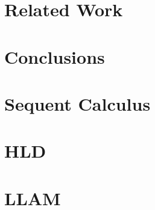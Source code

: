 \documentclass{llncs}
\begin{document}
\section{Related Work}


\section{Conclusions}





\clearpage
\appendix
\section{Sequent Calculus}

\section{HLD}


\section{LLAM}

\end{document}
